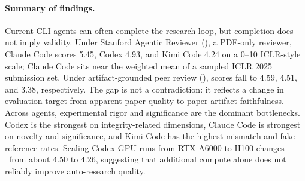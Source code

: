 \paragraph{Summary of findings.}
Current CLI agents can often complete the research loop, but completion does not imply validity. Under Stanford Agentic Reviewer (\sar), a PDF-only reviewer, Claude Code scores 5.45, Codex 4.93, and Kimi Code 4.24 on a 0--10 ICLR-style scale; Claude Code sits near the weighted mean of a sampled ICLR 2025 submission set. Under artifact-grounded peer review (\pr), scores fall to 4.59, 4.51, and 3.38, respectively. The gap is not a contradiction: it reflects a change in evaluation target from apparent paper quality to paper-artifact faithfulness. Across agents, experimental rigor and significance are the dominant bottlenecks. Codex is the strongest on integrity-related dimensions, Claude Code is strongest on novelty and significance, and Kimi Code has the highest mismatch and fake-reference rates. Scaling Codex GPU runs from RTX A6000 to H100 changes \pr\ from about 4.50 to 4.26, suggesting that additional compute alone does not reliably improve auto-research quality.
